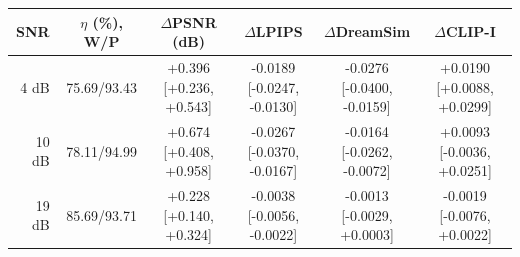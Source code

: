 \begin{tabular}{rccccc}
\toprule
SNR & $\eta$ (\%), W/P & $\Delta$PSNR (dB) & $\Delta$LPIPS & $\Delta$DreamSim & $\Delta$CLIP-I \\
\midrule
4 dB & 75.69/93.43 & \shortstack{+0.396\\[+0.236, +0.543]} & \shortstack{-0.0189\\[-0.0247, -0.0130]} & \shortstack{-0.0276\\[-0.0400, -0.0159]} & \shortstack{+0.0190\\[+0.0088, +0.0299]} \\
10 dB & 78.11/94.99 & \shortstack{+0.674\\[+0.408, +0.958]} & \shortstack{-0.0267\\[-0.0370, -0.0167]} & \shortstack{-0.0164\\[-0.0262, -0.0072]} & \shortstack{+0.0093\\[-0.0036, +0.0251]} \\
19 dB & 85.69/93.71 & \shortstack{+0.228\\[+0.140, +0.324]} & \shortstack{-0.0038\\[-0.0056, -0.0022]} & \shortstack{-0.0013\\[-0.0029, +0.0003]} & \shortstack{-0.0019\\[-0.0076, +0.0022]} \\
\bottomrule
\end{tabular}

